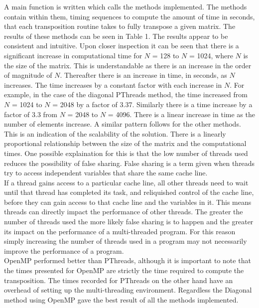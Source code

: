 \documentclass[a4paper, 11pt, onecolumn, conference]{IEEEtran}      %
\begin{document}
A main function is written which calls the methods implemented. The methods contain within them, timing sequences to compute the amount of time in seconds, that each transposition routine takes to fully transpose a given matrix. The results of these methods can be seen in Table 1. The results appear to be consistent and intuitive. Upon closer inspection it can be seen that there is a significant increase in computational time for $N$ = 128 to $N$ = 1024, where $N$ is the size of the matrix. This is understandable as there is an increase in the order of magnitude of $N$. Thereafter there is an increase in time, in seconds, as $N$ increases. The time increases by a constant factor with each increase in $N$. For example, in the case of the diagonal PThreads method, the time increased from $N$ = 1024 to $N$ = 2048 by a factor of 3.37. Similarly there is a time increase by a factor of 3.3 from $N$ = 2048 to $N$ = 4096. There is a linear increase in time as the number of elements increase. A similar pattern follows for the other methods.\\

This is an indication of the scalability of the solution. There is a linearly proportional relationship between the size of the matrix and the computational times. One possible explaination for this is that the low number of threads used reduces the possibility of false sharing. False sharing is a term given when threads try to access independent variables that share the same cache line\cite{thompson_2011}.\\

If a thread gains access to a particular cache line, all other threads need to wait until that thread has completed its task, and reliquished control of the cache line, before they can gain access to that cache line and the variables in it. This means threads can directly impact the performance of other threads. The greater the number of threads used the more likely false sharing is to happen and the greater its impact on the performance of a multi-threaded program. For this reason simply increasing the number of threads used in a program may not necessarily improve the performance of a program.\\

OpenMP performed better than PThreads, although it is important to note that the times presented for OpenMP are strictly the time required to compute the transposition. The times recorded for PThreads on the other hand have an overhead of setting up the multi-threading environment. Regardless the Diagonal method using OpenMP gave the best result of all the methods implemented.
\end{document}
